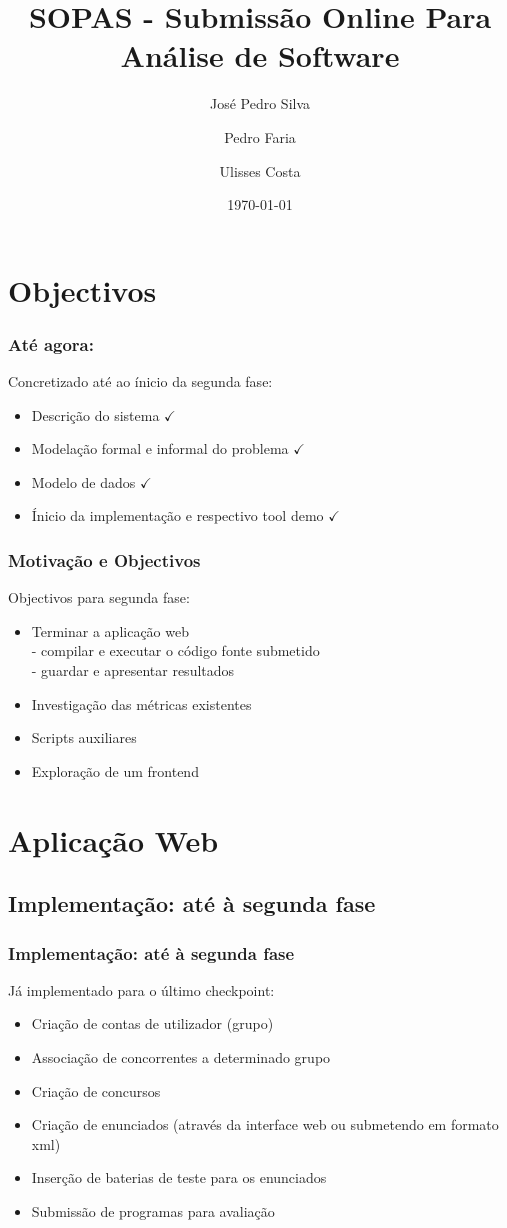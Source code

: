 \documentclass{beamer}
\title{SOPAS - Submissão Online Para Análise de Software}
\author{José Pedro Silva \and
Pedro Faria \and
Ulisses Costa
}
\date{\today}
\institute{Engenharia de Linguagens\\
Projecto integrado
}
\begin{document}
\begin{frame}
   \titlepage
\end{frame}

\section{Objectivos}
\begin{frame} \frametitle{Até agora:}
Concretizado até ao ínicio da segunda fase:
\begin{itemize}
\item Descrição do sistema {\color{green}$\checkmark$}
\item Modelação formal e informal do problema {\color{green}$\checkmark$}
\item Modelo de dados {\color{green}$\checkmark$}
\item Ínicio da implementação e respectivo tool demo {\color{green}$\checkmark$}
\end{itemize}
\end{frame}

\begin{frame} \frametitle{Motivação e Objectivos}
Objectivos para segunda fase:
\begin{itemize}
\item Terminar a aplicação web \\
- compilar e executar o código fonte submetido\\
- guardar e apresentar resultados\\
\item Investigação das métricas existentes
\item Scripts auxiliares
\item Exploração de um frontend
\end{itemize}
\end{frame}

\section{Aplicação Web}

\subsection{Implementação: até à segunda fase}
\begin{frame} \frametitle{Implementação: até à segunda fase}
Já implementado para o último checkpoint:
\begin{itemize}
\item Criação de contas de utilizador (grupo)
\item Associação de concorrentes a determinado grupo
\item Criação de concursos
\item Criação de enunciados (através da interface web ou submetendo em formato xml)
\item Inserção de baterias de teste para os enunciados
\item Submissão de programas para avaliação
\end{itemize}
\end{frame}
\end{document}
